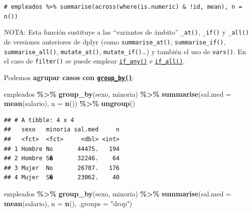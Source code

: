 \documentclass[
]{book}
\newenvironment{Shaded}{\begin{snugshade}}{\end{snugshade}}
\newcommand{\AttributeTok}[1]{\textcolor[rgb]{0.13,0.29,0.53}{#1}}
\newcommand{\CommentTok}[1]{\textcolor[rgb]{0.56,0.35,0.01}{\textit{#1}}}
\newcommand{\FunctionTok}[1]{\textcolor[rgb]{0.13,0.29,0.53}{\textbf{#1}}}
\newcommand{\NormalTok}[1]{#1}
\newcommand{\SpecialCharTok}[1]{\textcolor[rgb]{0.81,0.36,0.00}{\textbf{#1}}}
\newcommand{\StringTok}[1]{\textcolor[rgb]{0.31,0.60,0.02}{#1}}
\theoremstyle{break}
\theoremstyle{nonumberplain}
\renewcommand{\CommentTok}[1]{\textcolor[rgb]{0.41,0.41,0.41}{\texttt{#1}}}
\begin{document}
\begin{Shaded}
\begin{Highlighting}[]
\CommentTok{\# empleados \%\textgreater{}\% summarise(across(where(is.numeric) \& !id, mean), n = n())}
\end{Highlighting}
\end{Shaded}

NOTA: Esta función sustituye a las ``variantes de ámbito'' \texttt{\_at()}, \texttt{\_if()} y \texttt{\_all()} de versiones anteriores de dplyr (como \texttt{summarise\_at()}, \texttt{summarise\_if()}, \texttt{summarise\_all()}, \texttt{mutate\_at()}, \texttt{mutate\_if()}\ldots) y también el uso de \texttt{vars()}.
En el caso de \texttt{filter()} se puede emplear \href{https://dplyr.tidyverse.org/reference/across.html}{\texttt{if\_any()}} e \href{https://dplyr.tidyverse.org/reference/across.html}{\texttt{if\_all()}}.

Podemos \textbf{agrupar casos con \href{https://dplyr.tidyverse.org/reference/group_by.html}{\texttt{group\_by()}}}:

\begin{Shaded}
\begin{Highlighting}[]
\NormalTok{empleados }\SpecialCharTok{\%\textgreater{}\%} \FunctionTok{group\_by}\NormalTok{(sexo, minoria) }\SpecialCharTok{\%\textgreater{}\%} 
    \FunctionTok{summarise}\NormalTok{(}\AttributeTok{sal.med =} \FunctionTok{mean}\NormalTok{(salario), }\AttributeTok{n =} \FunctionTok{n}\NormalTok{()) }\SpecialCharTok{\%\textgreater{}\%}
    \FunctionTok{ungroup}\NormalTok{()}
\end{Highlighting}
\end{Shaded}

\begin{verbatim}
## # A tibble: 4 x 4
##   sexo   minoria sal.med     n
##   <fct>  <fct>     <dbl> <int>
## 1 Hombre No       44475.   194
## 2 Hombre S�       32246.    64
## 3 Mujer  No       26707.   176
## 4 Mujer  S�       23062.    40
\end{verbatim}

\begin{Shaded}
\begin{Highlighting}[]
\NormalTok{empleados }\SpecialCharTok{\%\textgreater{}\%} \FunctionTok{group\_by}\NormalTok{(sexo, minoria) }\SpecialCharTok{\%\textgreater{}\%} 
    \FunctionTok{summarise}\NormalTok{(}\AttributeTok{sal.med =} \FunctionTok{mean}\NormalTok{(salario), }\AttributeTok{n =} \FunctionTok{n}\NormalTok{(), }\AttributeTok{.groups =} \StringTok{"drop"}\NormalTok{)}
\end{Highlighting}
\end{Shaded}
\end{document}
